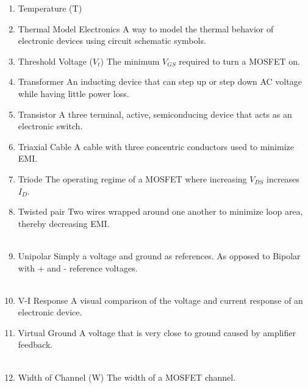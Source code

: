 \documentclass{IEEEtran}
\begin{document}
\begin{enumerate}
\\
\item Temperature (T)
\subitem  
\item Thermal Model Electronics
\subitem A way to model the thermal behavior of electronic devices using circuit schematic symbols.\\
\item Threshold Voltage ($V_t$)
\subitem The minimum $V_{GS}$ required to turn a MOSFET on. 
\item Transformer
\subitem An inducting device that can step up or step down AC voltage while having little power loss. \\
\item Transistor
  \subitem A three terminal, active, semiconducing device that acts as an electronic switch.\\
\item Triaxial Cable
  \subitem A cable with three concentric conductors used to minimize EMI. \\ 
\item Triode
  \subitem The operating regime of a MOSFET where increasing $V_{DS}$ increases $I_D$.\\
\item Twisted pair
\subitem Two wires wrapped around one another to minimize loop area, thereby decreasing EMI. \\

\\
\item Unipolar
  \subitem Simply a voltage and ground as references. As opposed to Bipolar with + and - reference voltages. \\ 

\\
\item V-I Response
  \subitem A visual comparison of the voltage and current response of an electronic device.\\
\item Virtual Ground
  \subitem A voltage that is very close to ground caused by amplifier feedback. \\

\\
\item Width of Channel (W)
  \subitem The width of a MOSFET channel.  
\\


\end{enumerate}
\end{document}
